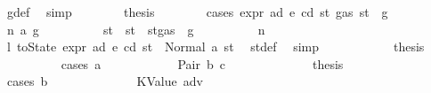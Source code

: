 \begin{isabellebody}
\ g{\isacharunderscore}{\kern0pt}def\ \isamarkupfalse%
\ simp\isanewline
\ \ \ \ \ \ \isamarkupfalse%
\ {\isacharquery}{\kern0pt}thesis\isanewline
\ \ \ \ \ \ \isamarkupfalse%
\ {\isacharparenleft}{\kern0pt}cases\ {\isachardoublequoteopen}expr\ ad\ e\ cd\ st{\isacharprime}{\kern0pt}\ {\isacharparenleft}{\kern0pt}gas\ st\ {\isacharminus}{\kern0pt}\ g{\isacharparenright}{\kern0pt}{\isachardoublequoteclose}{\isacharparenright}{\kern0pt}\isanewline
\ \ \ \ \ \ \ \ \isamarkupfalse%
\ {\isacharparenleft}{\kern0pt}n\ a{}\ g{\isacharprime}{\kern0pt}{\isacharparenright}{\kern0pt}\isanewline
\ \ \ \ \ \ \ \ \isamarkupfalse%
\ st{\isacharprime}{\kern0pt}{\isacharprime}{\kern0pt}\ \ {\isachardoublequoteopen}st{\isacharprime}{\kern0pt}{\isacharprime}{\kern0pt}\ {\isacharequal}{\kern0pt}\ st{\isacharprime}{\kern0pt}{\isasymlparr}gas\ {\isacharcolon}{\kern0pt}{\isacharequal}{\kern0pt}\ g{\isacharprime}{\kern0pt}{\isasymrparr}{\isachardoublequoteclose}\isanewline
\ \ \ \ \ \ \ \ \isamarkupfalse%
\ n\ \isamarkupfalse%
\ l{}{\isacharcolon}{\kern0pt}\ {\isachardoublequoteopen}toState\ {\isacharparenleft}{\kern0pt}expr\ ad\ e\ cd{\isacharparenright}{\kern0pt}\ st{\isacharprime}{\kern0pt}\ {\isacharequal}{\kern0pt}\ Normal\ {\isacharparenleft}{\kern0pt}a{}{\isacharcomma}{\kern0pt}\ st{\isacharprime}{\kern0pt}{\isacharprime}{\kern0pt}{\isacharparenright}{\kern0pt}{\isachardoublequoteclose}\ \isamarkupfalse%
\ st{\isacharprime}{\kern0pt}{\isacharunderscore}{\kern0pt}def\ \isamarkupfalse%
\ simp\isanewline
\ \ \ \ \ \ \ \ \isamarkupfalse%
\ \isamarkupfalse%
\ {\isacharquery}{\kern0pt}thesis\isanewline
\ \ \ \ \ \ \ \ \isamarkupfalse%
\ {\isacharparenleft}{\kern0pt}cases\ a{}{\isacharparenright}{\kern0pt}\isanewline
\ \ \ \ \ \ \ \ \ \ \isamarkupfalse%
\ {\isacharparenleft}{\kern0pt}Pair\ b\ c{\isacharparenright}{\kern0pt}\isanewline
\ \ \ \ \ \ \ \ \ \ \isamarkupfalse%
\ \isamarkupfalse%
\ {\isacharquery}{\kern0pt}thesis\isanewline
\ \ \ \ \ \ \ \ \ \ \isamarkupfalse%
\ {\isacharparenleft}{\kern0pt}cases\ b{\isacharparenright}{\kern0pt}\isanewline
\ \ \ \ \ \ \ \ \ \ \ \ \isamarkupfalse%
\ {\isacharparenleft}{\kern0pt}KValue\ adv{\isacharparenright}{\kern0pt}\isanewline
\ \ \ \ \ \ \ \ \ \ \ \ \isamarkupfalse%

\end{isabellebody}

